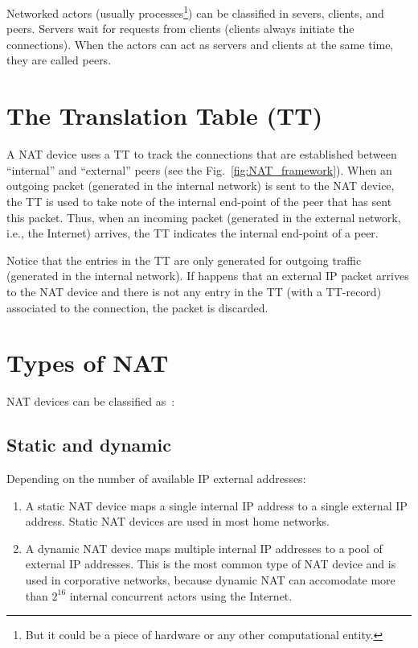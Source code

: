 Networked actors (usually processes\footnote{But it could be a piece
  of hardware or any other computational entity.}) can be classified
in severs, clients, and peers. Servers wait for requests from clients (clients always
initiate the connections). When the actors can act as servers and
clients at the same time, they are called peers.

\section{The Translation Table (TT)}

A NAT device uses a TT to track the connections that are established
between ``internal'' and ``external'' peers (see the
Fig.~\ref{fig:NAT_framework}). When an outgoing packet (generated in
the internal network) is sent to the NAT device, the TT is used to
take note of the internal end-point of the peer that has sent this
packet. Thus, when an incoming packet (generated in the external
network, i.e., the Internet) arrives, the TT indicates the internal
end-point of a peer.

Notice that the entries in the TT are only generated for outgoing
traffic (generated in the internal network). If happens that an
external IP packet arrives to the NAT device and there is not any
entry in the TT (with a TT-record) associated to the connection, the
packet is discarded.

\section{Types of NAT}

NAT devices can be classified as~\cite{jennings2007network}:

\subsection{Static and dynamic}

Depending on the number of available IP external addresses:

\begin{enumerate}
\item A static NAT device maps a single internal IP address to a
  single external IP address. Static NAT devices are used in most home
  networks.
\item A dynamic NAT device maps multiple internal IP addresses to a
  pool of external IP addresses. This is the most common type of NAT
  device and is used in corporative networks, because dynamic NAT can
  accomodate more than $2^{16}$ internal concurrent actors using the
  Internet.
\end{enumerate}

